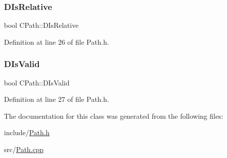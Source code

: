 \hypertarget{classCPath_af705ff149bb2281c67afb84fff550eb9}{}\label{classCPath_af705ff149bb2281c67afb84fff550eb9} 
\subsubsection{\texorpdfstring{D\+Is\+Relative}{DIsRelative}}
{\footnotesize\ttfamily bool C\+Path\+::\+D\+Is\+Relative\hspace{0.3cm}{\ttfamily [protected]}}



Definition at line 26 of file Path.\+h.

\hypertarget{classCPath_a992aca27a1cba1c3bae3d04438821192}{}\label{classCPath_a992aca27a1cba1c3bae3d04438821192} 
\subsubsection{\texorpdfstring{D\+Is\+Valid}{DIsValid}}
{\footnotesize\ttfamily bool C\+Path\+::\+D\+Is\+Valid\hspace{0.3cm}{\ttfamily [protected]}}



Definition at line 27 of file Path.\+h.



The documentation for this class was generated from the following files\+:\begin{DoxyCompactItemize}
\item 
include/\hyperlink{Path_8h}{Path.\+h}\item 
src/\hyperlink{Path_8cpp}{Path.\+cpp}\end{DoxyCompactItemize}
